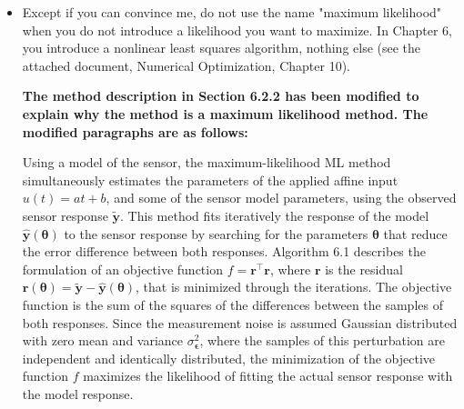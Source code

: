 \documentclass[11pt]{article}
\begin{document}
\begin{itemize}
    {\bfseries The first paragraph of Section 5.1 has been added to explain the purpose of the simulations in Chapters 5, with respect to the simulations in Chapter 4.   }

    \color{blue} 
    The simulations described in Chapter 4 were conducted with an illustrative example that is assumed to be a second order weighing sensor.
    A weighing sensor was implemented to relate experimental results with the simulations. 
    As it will be detailed later, the order of the practical sensor is at least is fifth order. 
    Thus, the simulations presented in this section are useful to get insight on the impact of that increasing the model order has on the accuracy of the bias and variance predictions.    
    \color{black}


    \item Except if you can convince me, do not use the name "maximum likelihood" when you do not introduce a likelihood you want to maximize. In Chapter 6, you introduce a nonlinear least squares algorithm, nothing else (see the attached document, Numerical Optimization, Chapter 10).
    
    {\bfseries The method description in Section 6.2.2 has been modified to explain why the method is a maximum likelihood method. The modified paragraphs are as follows: }
    
    \color{blue} 
    Using a model of the sensor, the maximum-likelihood ML method simultaneously estimates the parameters of the applied affine input $u(t) = at + b$, and some of the sensor model parameters, using the observed sensor response $\widetilde{\mathbf{y}}$.
    This method fits iteratively the response of the model $\widehat{\mathbf{y}}(\bm{\theta})$ to the sensor response by searching for the parameters $\bm{\theta}$ that reduce the error difference between both responses.
    Algorithm 6.1 describes the formulation of an objective function $f = \mathbf{r}^\top \mathbf{r}$, where $\mathbf{r}$ is the residual $\mathbf{r}(\bm{\theta}) = \widetilde{\mathbf{y}} - \widehat{\mathbf{y}}(\bm{\theta})$, that is minimized through the iterations.
    The objective function is the sum of the squares of the differences between the samples of both responses.
    Since the measurement noise is assumed Gaussian distributed with zero mean and variance $\sigma_{\bm{\epsilon}}^2$, where the samples of this perturbation are independent and identically distributed, the minimization of the objective function $f$ maximizes the likelihood of fitting the actual sensor response with the model response.



\end{itemize}
\end{document}
